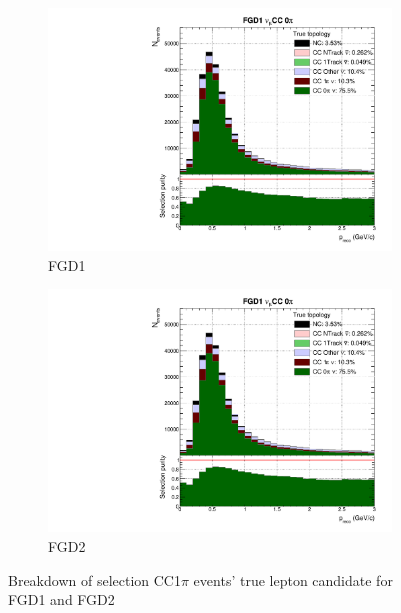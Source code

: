 \begin{figure}[!h]
	\begin{subfigure}[t]{0.49\textwidth}
		\includegraphics[width=\textwidth,page=4, trim={0mm 0mm 0mm 9mm}, clip]{figures/mach3/selection/2017b_Diag_WithSelection}
		\caption{FGD1}
	\end{subfigure}
	\begin{subfigure}[t]{0.49\textwidth}
		\includegraphics[width=\textwidth,page=10, trim={0mm 0mm 0mm 9mm}, clip]{figures/mach3/selection/2017b_Diag_WithSelection}
		\caption{FGD2}
	\end{subfigure}
	\caption{Breakdown of selection CC1$\pi$ events' true lepton candidate for FGD1 and FGD2 }
	\label{fig:cc1pi_muon}
\end{figure}


